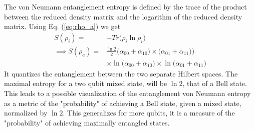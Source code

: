The von Neumann entanglement entropy is defined by the trace of the product between the reduced density matrix and the logarithm of the reduced density matrix. Using Eq. (\ref{eq:rho_a}) we get 
\begin{align}
    S(\rho_i) =& - Tr\Big(\rho_i \ln \rho_i\Big) \\
    \implies S(\rho_a) =& \frac{\ln2}{2}\Big(\alpha_{00}+\alpha_{10}\big) \times \big(\alpha_{01}+\alpha_{11}\big)\Big)\\ &\times\ln\big(\alpha_{00}+\alpha_{10}\big) \times\ln \big(\alpha_{01}+\alpha_{11}\big) \nonumber
\end{align}
It quantizes the entanglement between the two separate Hilbert spaces. The maximal entropy for a two qubit mixed state, will be $\ln 2$, that of a Bell state. This leads to a possible visualization of the entanglement von Neumann entropy as a metric of the "probability" of achieving a Bell state, given a mixed state, normalized by $\ln 2$. This generalizes for more qubits, it is a measure of the "probability" of achieving maximally entangled states. 
